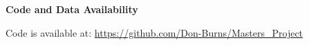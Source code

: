 \documentclass[a4paper, 11pt, hidelinks]{article} %
\begin{document}
	
	
	\nolinenumbers
	
	\textbf{Code and Data Availability}

	Code is available at: \url{https://github.com/Don-Burns/Masters_Project}
	
	
	\newpage
	\linenumbers
	
	
	\printbibliography
	
	\nolinenumbers
	
	
	\newpage
	
	
	
\end{document}
